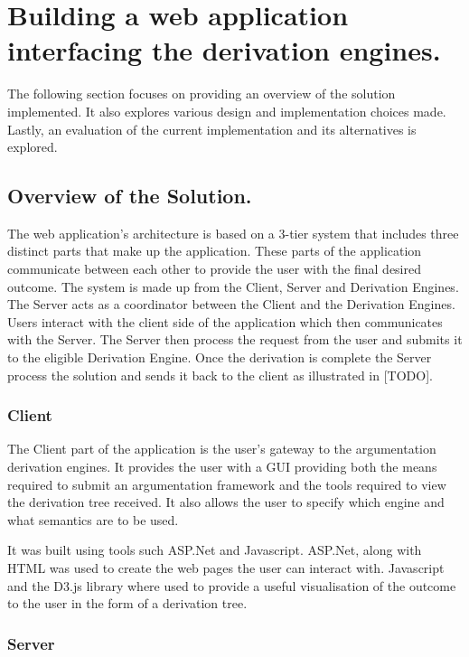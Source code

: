\newpage

\chapter{Building a web application interfacing the derivation engines.}

The following section focuses on providing an overview of the solution implemented. It also explores various design and implementation choices made. Lastly, an evaluation of the current implementation and its alternatives is explored.

\section{Overview of the Solution.}

The web application's architecture is based on a 3-tier system that includes three distinct parts that make up the application. These parts of the application communicate between each other to provide the user with the final desired outcome. 	The system is made up from the Client, Server and Derivation Engines. The Server acts as a coordinator between the Client and the Derivation Engines. Users interact with the client side of the application which then communicates with the Server. The Server then process the request from the user and submits it to the eligible Derivation Engine. Once the derivation is complete the Server process the solution and sends it back to the client as illustrated in [TODO].

\subsection{Client}

The Client part of the application is the user's gateway to the argumentation derivation engines. It provides the user with a GUI providing both the means required to submit an argumentation framework and  the tools required to view the derivation tree received. It also allows the user to specify which engine and what semantics are to be used.

It was built using tools such ASP.Net and Javascript. ASP.Net, along with HTML was used to create the web pages the user can interact with. Javascript and the D3.js library where used to provide a useful visualisation of the outcome to the user in the form of a derivation tree.

\subsection{Server}

